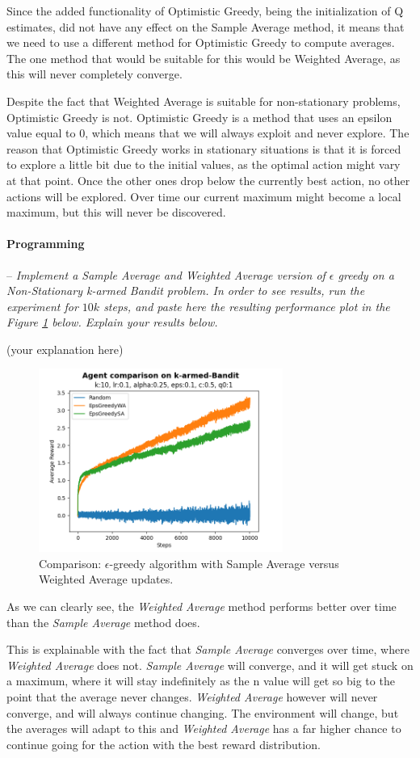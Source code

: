 \documentclass[a4paper]{article}
\newcommand{\programming}[1]{
\paragraph{Programming} -- \textit{#1}

}
\begin{document}
Since the added functionality of Optimistic Greedy, being the initialization of Q estimates, did not have any effect on the Sample Average method, it means that we need to use a different method for Optimistic Greedy to compute averages. The one method that would be suitable for this would be Weighted Average, as this will never completely converge.

Despite the fact that Weighted Average is suitable for non-stationary problems, Optimistic Greedy is not. Optimistic Greedy is a method that uses an epsilon value equal to 0, which means that we will always exploit and never explore. The reason that Optimistic Greedy works in stationary situations is that it is forced to explore a little bit due to the initial values, as the optimal action might vary at that point. Once the other ones drop below the currently best action, no other actions will be explored. Over time our current maximum might become a local maximum, but this will never be discovered.

\programming{Implement a Sample Average and Weighted Average version of $\epsilon$ greedy on a Non-Stationary k-armed Bandit problem. In order to see results, run the experiment for $10k$ steps, and paste here the resulting performance plot in the Figure \ref{fig:sa_vs_wa} below. Explain your results below.}
(your explanation here)
\begin{figure}[H]
    \centering
    \includegraphics[width=8cm]{plots/agent_comparison_perf.png}
    \caption{Comparison: $\epsilon$-greedy algorithm with Sample Average versus Weighted Average updates.}
    \label{fig:sa_vs_wa}
\end{figure}{}

As we can clearly see, the \textit{Weighted Average} method performs better over time than the \textit{Sample Average} method does. 

This is explainable with the fact that \textit{Sample Average} converges over time, where \textit{Weighted Average} does not. \textit{Sample Average} will converge, and it will get stuck on a maximum, where it will stay indefinitely as the n value will get so big to the point that the average never changes. \textit{Weighted Average} however will never converge, and will always continue changing. The environment will change, but the averages will adapt to this and \textit{Weighted Average} has a far higher chance to continue going for the action with the best reward distribution.
\end{document}
